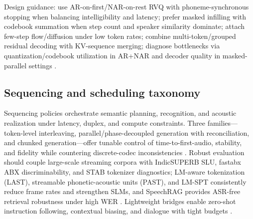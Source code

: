 \documentclass{article}
\begin{document}
Design guidance: use AR-on-first/NAR-on-rest RVQ with phoneme-synchronous stopping when balancing intelligibility and latency; prefer masked infilling with codebook summation when step count and speaker similarity dominate; attach few-step flow/diffusion under low token rates; combine multi-token/grouped residual decoding with KV-sequence merging; diagnose bottlenecks via quantization/codebook utilization in AR+NAR and decoder quality in masked-parallel settings \cite{li2024masksrmaskedlanguagemodelfullbandspeechr,li2024investigatingneuralaudiocodecsspeechlang,wang2025tadicodectextawarediffusionspeechtokeniz}.

\subsection{Sequencing and scheduling taxonomy} \label{subsec:Sequencing and scheduling taxonomy}
Sequencing policies orchestrate semantic planning, recognition, and acoustic realization under latency, duplex, and compute constraints. Three families---token-level interleaving, parallel/phase-decoupled generation with reconciliation, and chunked generation---offer tunable control of time-to-first-audio, stability, and fidelity while countering discrete-codec inconsistencies \cite{liu2024analyzingmitigatinginconsistencydiscrete}. Robust evaluation should couple large-scale streaming corpora with IndicSUPERB SLU, fastabx ABX discriminability, and STAB tokenizer diagnostics; LM-aware tokenization (LAST), streamable phonetic-acoustic units (PAST), and LM-SPT consistently reduce frame rates and strengthen SLMs, and SpeechRAG provides ASR-free retrieval robustness under high WER \cite{turetzky2024lastlanguagemodelawarespeechtokenization,har-tuv2025pastphoneticacousticspeechtokenizer,jo2025lmsptalignedsemanticdistillationspeechto,poli2025fastabxlibraryefficientcomputationabxdis,vashishth2024stabspeechtokenizerassessmentbenchmark,min2025speechretrievalaugmentedgenerationwithou,entry2025indicsuperbspeechprocessinguniversalperf}. Lightweight bridges enable zero-shot instruction following, contextual biasing, and dialogue with tight budgets \cite{wang2023slmbridgethingapbetweenspeechtextfoundat}.
\end{document}

